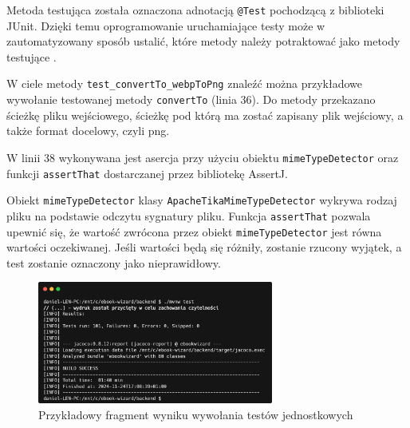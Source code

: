 Metoda testująca została oznaczona adnotacją \verb|@Test| pochodzącą z biblioteki JUnit. Dzięki temu oprogramowanie uruchamiające testy może w zautomatyzowany sposób ustalić, które metody należy potraktować jako metody testujące \cite{junit_user_guide}.

W ciele metody \verb|test_convertTo_webpToPng| znaleźć można przykładowe wywołanie testowanej metody \verb|convertTo| (linia 36). Do metody przekazano ścieżkę pliku wejściowego, ścieżkę pod którą ma zostać zapisany plik wejściowy, a także format docelowy, czyli png.

W linii 38 wykonywana jest asercja przy użyciu obiektu \verb|mimeTypeDetector| oraz funkcji \verb|assertThat| dostarczanej przez bibliotekę AssertJ.

Obiekt \verb|mimeTypeDetector| klasy \verb|ApacheTikaMimeTypeDetector| wykrywa rodzaj pliku na podstawie odczytu sygnatury pliku. Funkcja \verb|assertThat| pozwala upewnić się, że wartość zwrócona przez obiekt \verb|mimeTypeDetector| jest równa wartości oczekiwanej. Jeśli wartości będą się różniły, zostanie rzucony wyjątek, a test zostanie oznaczony jako nieprawidłowy. \cite{assertj_docs}

\begin{figure}[h]
    \centering
    \setlength{\fboxsep}{0pt}
    \setlength{\fboxrule}{0.4pt}
    \includegraphics[width=0.69\textwidth]{chap6/carbon_ut.png}
    \caption{Przykładowy fragment wyniku wywołania testów jednostkowych}
    \label{fig:carbon_ut}
\end{figure}

